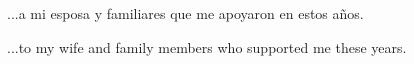 ...a mi esposa y familiares que me apoyaron en estos años.

...to my wife and family members who supported me these years.
\clearpage